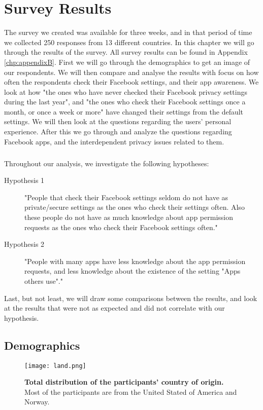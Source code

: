 \chapter{Survey Results}
\label{chp:surveyresults} 

The survey we created was available for three weeks, and in that period of time we collected 250 responses from 13 different countries. In this chapter we will go through the results of the survey. All survey results can be found in Appendix \ref{chp:appendixB}. First we will go through the demographics to get an image of our respondents. We will then compare and analyse the results with focus on how often the respondents check their Facebook settings, and their app awareness. We look at how "the ones who have never checked their Facebook privacy settings during the last year", and "the ones who check their Facebook settings once a month, or once a week or more" have changed their settings from the default settings. We will then look at the questions regarding the users' personal experience. After this we go through and analyze the questions regarding Facebook apps, and the interdependent privacy issues related to them. 

\paragraph{}
Throughout our analysis, we investigate the following hypotheses: 
\begin{description}
\item [Hypothesis 1] "People that check their Facebook settings seldom do not have as private/secure settings as the ones who check their settings often. Also these people do not have as much knowledge about app permission requests as the ones who check their Facebook settings often."
\item [Hypothesis 2] "People with many apps have less knowledge about the app permission requests, and less knowledge about the existence of the setting "Apps others use"."
\end{description}

Last, but not least, we will draw some comparisons between the results, and look at the results that were not as expected and did not correlate with our hypothesis. 

\section{Demographics}

\begin{figure}[h!]
\centering
\texttt{[image: land.png]}
\caption[Total distribution of the participants' country of origin]{\textbf{Total distribution of the participants' country of origin.} Most of the participants are from the United Stated of America and Norway.} 
\label{fig:land}
\end{figure}


